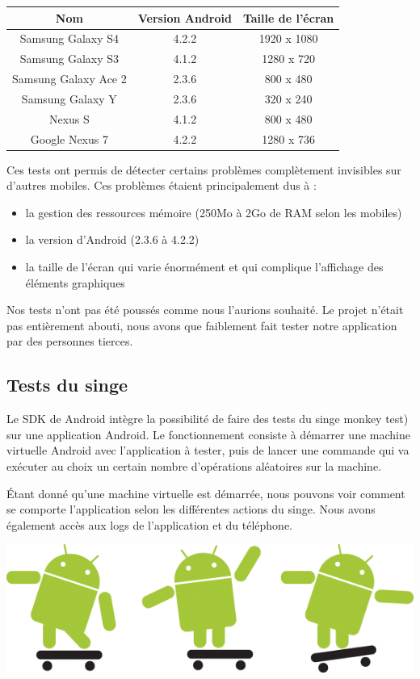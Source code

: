 \documentclass{report}
\begin{document}
\begin{center}
\begin{tabular}{|c|c|c|}
\hline
{\bf Nom} & {\bf Version Android} & {\bf Taille de l'écran}\\
\hline
Samsung Galaxy S4 & 4.2.2 & 1920 x 1080\\
\hline
Samsung Galaxy S3 & 4.1.2 & 1280 x 720\\
\hline
Samsung Galaxy Ace 2 & 2.3.6 & 800 x 480\\
\hline
Samsung Galaxy Y & 2.3.6 & 320 x 240\\
\hline
Nexus S & 4.1.2 & 800 x 480\\
\hline
Google Nexus 7 & 4.2.2 & 1280 x 736\\
\hline
\end{tabular}
\end{center}
Ces tests ont permis de détecter certains problèmes complètement
invisibles sur d’autres mobiles. Ces problèmes étaient principalement
dus à :
\bigskip
\begin{itemize}
\item la gestion des ressources mémoire (250Mo à 2Go de RAM selon
les mobiles)
\item la version d’Android (2.3.6 à 4.2.2)
\item la taille de l’écran qui varie énormément et qui complique
l’affichage des éléments graphiques
\end{itemize}
\bigskip

Nos tests n’ont pas été poussés comme nous l’aurions souhaité. Le
projet n’était pas entièrement abouti, nous avons que faiblement fait
tester notre application par des personnes tierces.

\subsection{Tests du singe}
\bigskip


Le SDK de Android intègre la possibilité de faire des tests du singe
monkey test) sur une application Android. Le fonctionnement consiste à
démarrer une machine virtuelle Android avec l’application à tester, puis
de lancer une commande qui va exécuter au choix un certain nombre
d'opérations aléatoires sur la machine.

Étant donné qu’une machine virtuelle est démarrée, nous pouvons voir
comment se comporte l’application selon les différentes actions du
singe. Nous avons également accès aux logs de l’application et du
téléphone.

\begin{center}
\includegraphics[scale=0.8]{images/monkey}
\end{center}
\end{document}
